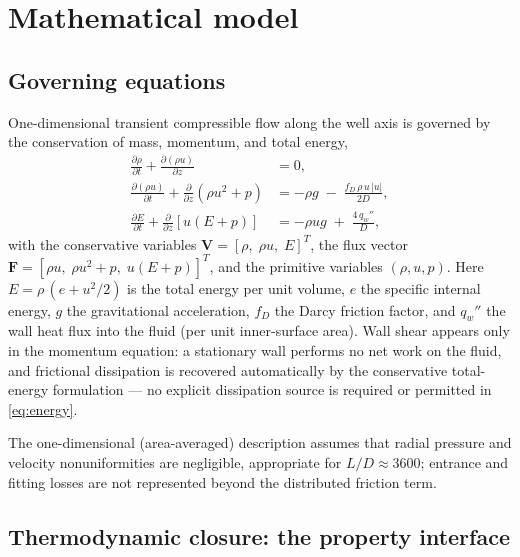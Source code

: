 \documentclass[11pt]{article}
\newcommand{\pd}[2]{\frac{\partial #1}{\partial #2}}
\begin{document}
\section{Mathematical model}
\label{sec:model}

\subsection{Governing equations}

One-dimensional transient compressible flow along the well axis is
governed by the conservation of mass, momentum, and total energy,
\begin{align}
\pd{\rho}{t} + \pd{(\rho u)}{z} &= 0, \label{eq:mass}\\
\pd{(\rho u)}{t} + \pd{}{z}\!\left(\rho u^{2} + p\right) &=
  -\rho g \;-\; \frac{f_D\,\rho\,u\,|u|}{2D}, \label{eq:mom}\\
\pd{E}{t} + \pd{}{z}\!\left[u\left(E + p\right)\right] &=
  -\rho u g \;+\; \frac{4\,q_w''}{D}, \label{eq:energy}
\end{align}
with the conservative variables $\mathbf{V} = [\rho,\;\rho u,\;E]^T$,
the flux vector
$\mathbf{F} = [\rho u,\;\rho u^2 + p,\;u(E+p)]^T$, and the primitive
variables $(\rho, u, p)$. Here $E = \rho\,(e + u^2/2)$ is the total
energy per unit volume, $e$ the specific internal energy, $g$ the
gravitational acceleration, $f_D$ the Darcy friction factor, and
$q_w''$ the wall heat flux into the fluid (per unit inner-surface area).
Wall shear appears only in the momentum equation: a stationary wall
performs no net work on the fluid, and frictional dissipation is
recovered automatically by the conservative total-energy formulation ---
no explicit dissipation source is required or permitted in
\cref{eq:energy}.

The one-dimensional (area-averaged) description assumes that radial
pressure and velocity nonuniformities are negligible, appropriate for
$L/D \approx 3600$; entrance and fitting losses are not represented
beyond the distributed friction term.

\subsection{Thermodynamic closure: the property interface}
\label{sec:interface}
\end{document}
